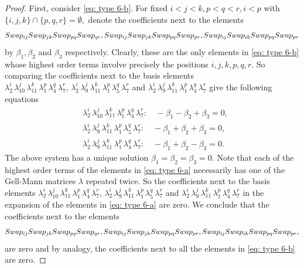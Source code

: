\documentclass[10pt,a4paper]{amsart}
\begin{document}
\begin{proof}
First, consider \eqref{eq: type 6-b}. For fixed $i < j < k, p<q<r, i<p$ with $\{i,j,k\} \cap \{p,q,r\} = \emptyset,$ denote the coefficients next to the elements 
$$\textnormal{Swap}_{ij} \textnormal{Swap}_{jk} \textnormal{Swap}_{pq} \textnormal{Swap}_{qr}, \textnormal{Swap}_{ij} \textnormal{Swap}_{jk} \textnormal{Swap}_{pq} \textnormal{Swap}_{pr}, \textnormal{Swap}_{ij} \textnormal{Swap}_{ik} \textnormal{Swap}_{pq} \textnormal{Swap}_{pr}$$ 
by $\beta_1,\beta_2$ and $\beta_3$ respectively. Clearly, these are the only elements in \eqref{eq: type 6-b} whose highest order terms involve precisely the positions $i,j,k,p,q,r.$
So comparing the coefficients next to the basis elements $\lambda_2^i\, \lambda_{10}^j\, \lambda_{11}^k\, \lambda_1^p\, \lambda_4^q\, \lambda_7^r, \, \lambda_2^i\, \lambda_9^j\, \lambda_{11}^k\, \lambda_1^p\, \lambda_5^q\, \lambda_7^r$ and $\lambda_2^i\, \lambda_9^j\, \lambda_{11}^k\, \lambda_1^p\, \lambda_4^q\, \lambda_7^r$ give the following equations
	\begin{align*}
		&\lambda_2^i\, \lambda_{10}^j\, \lambda_{11}^k\, \lambda_1^p\, \lambda_4^q\, \lambda_7^r : \quad -\beta_1 -\beta_2 + \beta_3 =0,\\
		&\lambda_2^i\, \lambda_9^j\, \lambda_{11}^k\, \lambda_1^p\, \lambda_5^q\, \lambda_7^r : \quad -\beta_1 +\beta_2 + \beta_3 =0,\\
		&\lambda_2^i\, \lambda_9^j\, \lambda_{11}^k\, \lambda_1^p\, \lambda_4^q\, \lambda_7^r
: \quad -\beta_1 +\beta_2-\beta_3 =0.
	\end{align*}
 The above system has a unique solution $\beta_1=\beta_2=\beta_3=0.$
 Note that each of the highest order terms of the elements in \eqref{eq: type 6-a} necessarily has one of the Gell-Mann matrices $\lambda$ repeated twice. So the coefficients next to the basis elements $\lambda_2^i\, \lambda_{10}^j\, \lambda_{11}^k\, \lambda_1^p\, \lambda_4^q\, \lambda_7^r, \, \lambda_2^i\, \lambda_9^j\, \lambda_{11}^k\, \lambda_1^p\, \lambda_5^q\, \lambda_7^r$ and $\lambda_2^i\, \lambda_9^j\, \lambda_{11}^k\, \lambda_1^p\, \lambda_4^q\, \lambda_7^r$ in the expansion of the elements in  \eqref{eq: type 6-a} are zero.
 We conclude that the coefficients next to the elements
 $$\textnormal{Swap}_{ij} \textnormal{Swap}_{jk} \textnormal{Swap}_{pq} \textnormal{Swap}_{qr}, \textnormal{Swap}_{ij} \textnormal{Swap}_{jk} \textnormal{Swap}_{pq} \textnormal{Swap}_{pr}, \textnormal{Swap}_{ij} \textnormal{Swap}_{ik} \textnormal{Swap}_{pq} \textnormal{Swap}_{pr},$$ 
are zero and by analogy, the coefficients next to all the elements in  \eqref{eq: type 6-b} are zero.


\end{proof}
\end{document}
